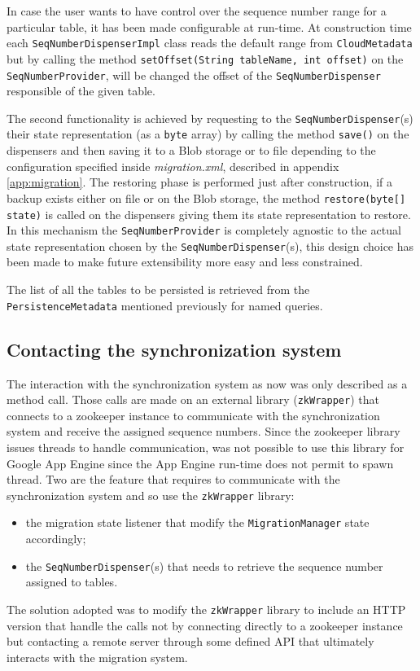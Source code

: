 \noindent In case the user wants to have control over the sequence number range for a particular table, it has been made configurable at run-time. At construction time each \texttt{SeqNumberDispenserImpl}  class reads the default range from \texttt{CloudMetadata} but by calling the method \texttt{setOffset(String tableName, int offset)} on the \texttt{SeqNumberProvider}, will be changed the offset of the \texttt{SeqNumberDispenser} responsible of the given table.

\newparagraph The second functionality is achieved by requesting to the \texttt{SeqNumberDispenser}(s) their state representation (as a \texttt{byte} array) by calling the method \texttt{save()} on the dispensers and then saving it to a Blob storage or to file depending to the configuration specified inside \textit{migration.xml}, described in appendix \ref{app:migration}. 
\noindent The restoring phase is performed just after construction, if a backup exists either on file or on the Blob storage, the method \texttt{restore(byte[] state)} is called on the dispensers giving them its state representation to restore.
In this mechanism the \texttt{SeqNumberProvider} is completely agnostic to the actual state representation chosen by the \texttt{SeqNumberDispenser}(s), this design choice has been made to make future extensibility more easy and less constrained.

\noindent The list of all the tables to be persisted is retrieved from the \texttt{PersistenceMetadata} mentioned previously for named queries.
 
\subsection{Contacting the synchronization system}
The interaction with the synchronization system as now was only described as a method call. Those calls are made on an external library (\texttt{zkWrapper}) that connects to a zookeeper instance to communicate with the synchronization system and receive the assigned sequence numbers.
Since the zookeeper library issues threads to handle communication, was not possible to use this library for Google App Engine since the App Engine run-time does not permit to spawn thread.
Two are the feature that requires to communicate with the synchronization system and so use the \texttt{zkWrapper} library:
\begin{itemize}
\item the migration state listener that modify the \texttt{MigrationManager} state accordingly;
\item the \texttt{SeqNumberDispenser}(s) that needs to retrieve the sequence number assigned to tables.
\end{itemize} 
\noindent The solution adopted was to modify the \texttt{zkWrapper} library to include an HTTP version that handle the calls not by connecting directly to a zookeeper instance but contacting a remote server through some defined API that ultimately interacts with the migration system.

